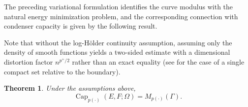 \documentclass[12pt]{amsart}
\numberwithin{equation}{section}
\theoremstyle{plain}
\newtheorem{theorem}[equation]{Theorem}
\theoremstyle{definition}
\begin{document}
The preceding variational formulation identifies the curve modulus
with the natural energy minimization problem, and the corresponding
connection with condenser capacity is given by the following result.

Note that without the log-H\"older continuity assumption, assuming only the density of smooth functions yields a two-sided estimate with a dimensional distortion factor $n^{p^+/2}$ rather than an exact equality (see \cite[Theorem~5.4]{Har07} for the case of a single compact set relative to the boundary).

\begin{theorem}
\label{thm:cap_mod}
Under the assumptions above,
\begin{equation}
\label{eq:cap_mod_equality}
\operatorname{Cap}_{p(\cdot)}(E,F;\Omega)
=
M_{p(\cdot)}(\Gamma).
\end{equation}
\end{theorem}
\end{document}
